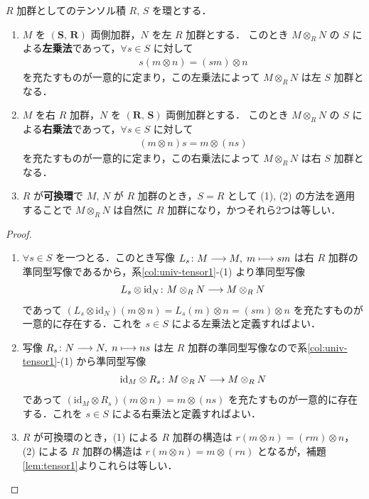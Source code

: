 \documentclass[algtopo_main]{subfiles}
\begin{document}
\begin{mycol}[label=col:tensor-R]{$R$ 加群としてのテンソル積}
	$R,\, S$ を環とする．
	\begin{enumerate}
		\item $M$ を $(\bm{S},\, \bm{R})$ 両側加群，$N$ を左 $R$ 加群とする．
		このとき $M \otimes_R N$ の $S$ による\textbf{左乗法}であって，$\forall s \in S$ に対して
		\begin{align}
			s (m \otimes n) = (sm) \otimes n
		\end{align}
		を充たすものが一意的に定まり，この左乗法によって $M \otimes_R N$ は左 $S$ 加群となる．
		\item $M$ を右 $R$ 加群，$N$ を $(\bm{R},\, \bm{S})$ 両側加群とする．
		このとき $M \otimes_R N$ の $S$ による\textbf{右乗法}であって，$\forall s \in S$ に対して
		\begin{align}
			(m \otimes n) s = m \otimes (ns)
		\end{align}
		を充たすものが一意的に定まり，この右乗法によって $M \otimes_R N$ は右 $S$ 加群となる．
		\item $R$ が\textbf{可換環}で $M,\, N$ が $R$ 加群のとき，$S = R$ として (1), (2) の方法を適用することで $M \otimes_R N$ は自然に $R$ 加群になり，かつそれら2つは等しい．
	\end{enumerate}
	
\end{mycol}

\begin{proof}
	\begin{enumerate}
		\item $\forall s \in S$ を一つとる．このとき写像 $L_s \colon M \longrightarrow M,\; m \longmapsto sm$ は右 $R$ 加群の準同型写像であるから，系\ref{col:univ-tensor1}-(1) より準同型写像
		\begin{align}
			L_s \otimes \mathrm{id}_N \colon M \otimes_R N \longrightarrow M \otimes_R N
		\end{align}
		であって $(L_s \otimes \mathrm{id}_N)(m \otimes n) = L_s(m) \otimes n = (sm) \otimes n$ を充たすものが一意的に存在する．これを $s \in S$ による左乗法と定義すればよい．
		\item 写像 $R_s \colon N \longrightarrow N,\; n \longmapsto ns$ は左 $R$ 加群の準同型写像なので系\ref{col:univ-tensor1}-(1) から準同型写像
		\begin{align}
			\mathrm{id}_M \otimes R_s \colon M \otimes_R N \longrightarrow M \otimes_R N
		\end{align}
		であって $(\mathrm{id}_M \otimes R_s)(m \otimes n) = m \otimes (ns)$ を充たすものが一意的に存在する．これを $s \in S$ による右乗法と定義すればよい．
		\item $R$ が可換環のとき，(1) による $R$ 加群の構造は $r(m\otimes n) = (rm) \otimes n$，(2) による $R$ 加群の構造は $r(m \otimes n) = m \otimes (rn)$ となるが，補題\ref{lem:tensor1}よりこれらは等しい．
	\end{enumerate}
\end{proof}
\end{document}
